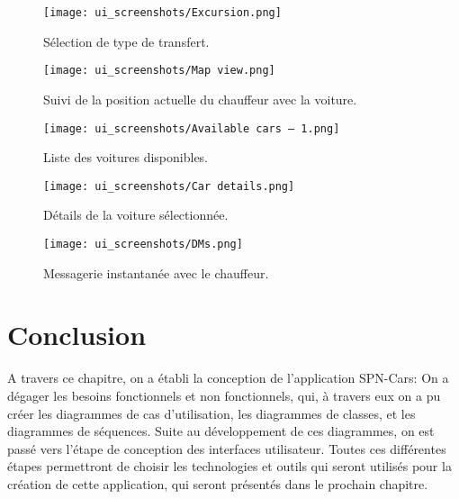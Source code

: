 \clearpage
\begin{multicols}{2}
    \begin{figure}[H]
        \centering
        \texttt{[image: ui\_screenshots/Excursion.png]}
        \vspace{1cm}
        \captionsetup{justification=centering}

        \caption{\centering Sélection de type de transfert.}
        \label{fig:trip_select}
    \end{figure}
    \begin{figure}[H]
        \centering
        \texttt{[image: ui\_screenshots/Map view.png]}
        \vspace{1cm}
        \captionsetup{justification=centering}

        \caption{\centering Suivi de la position actuelle du chauffeur avec la voiture.}
        \label{fig:follow_driver}
    \end{figure}
\end{multicols}
\begin{multicols}{2}
    \begin{figure}[H]
        \centering
        \texttt{[image: ui\_screenshots/Available cars – 1.png]}
        \vspace{1cm}
        \captionsetup{justification=centering}

        \caption{\centering Liste des voitures disponibles.}
        \label{fig:available_cars}
    \end{figure}
    \begin{figure}[H]
        \centering
        \texttt{[image: ui\_screenshots/Car details.png]}
        \vspace{1cm}
        \captionsetup{justification=centering}

        \caption{\centering Détails de la voiture sélectionnée.}
        \label{fig:car_details}
    \end{figure}
\end{multicols}
\vspace{1cm}
\begin{figure}[H]
    \centering
    \texttt{[image: ui\_screenshots/DMs.png]}
    \vspace{1cm}
    \caption{\centering Messagerie instantanée avec le chauffeur.}
    \label{fig:dms}
\end{figure}
\section{Conclusion}
A travers ce chapitre, on a établi la conception de l'application SPN-Cars: On a dégager les besoins fonctionnels et non fonctionnels, qui, à travers eux on a pu créer les diagrammes de cas d'utilisation, les diagrammes de classes, et les diagrammes de séquences. Suite au développement de ces diagrammes, on est passé vers l'étape de conception des interfaces utilisateur. Toutes ces différentes étapes permettront de choisir les technologies et outils qui seront utilisés pour la création de cette application, qui seront présentés dans le prochain chapitre.